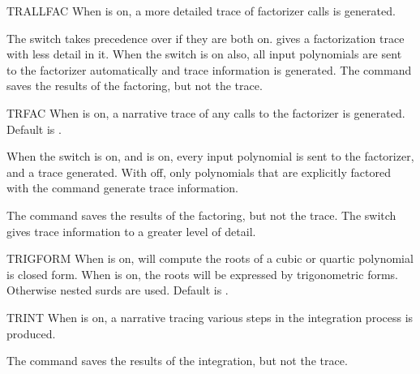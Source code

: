 \begin{Switch}{TRALLFAC}
When  is on, a more detailed trace of factorizer calls is
generated.

\begin{Comments}
The  switch takes precedence over  if they are
both on.  gives a factorization trace with less detail in it.
When the  switch is on also, all input polynomials are sent to
the factorizer automatically and trace information is generated.  The
 command saves the results of the factoring, but not the trace.
\end{Comments}
\end{Switch}


\begin{Switch}{TRFAC}
When  is on, a narrative trace of any calls to the factorizer is
generated.  Default is .

\begin{Comments}
When the switch  is on, and  is on, every input
polynomial is sent to the factorizer, and a trace generated.  With
 off, only polynomials that are explicitly factored with the
command  generate trace information.

The  command saves the results of the factoring, but not
the trace.  The  switch gives trace information to a
greater level of detail.
\end{Comments}
\end{Switch}

\begin{Switch}{TRIGFORM}
When  is on,  will compute the
roots of a cubic or quartic polynomial is closed form. When 
 is on, the roots will be expressed by trigonometric
forms. Otherwise nested surds are used. Default is .
\end{Switch}


\begin{Switch}{TRINT}
When  is on, a narrative tracing various steps in the
integration process is produced.

\begin{Comments}
The  command saves the results of the integration, but not the
trace.
\end{Comments}
\end{Switch}

